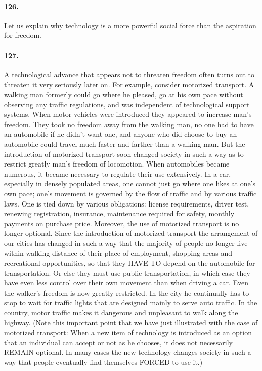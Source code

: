 \documentclass[12pt]{book}
\begin{document}
\paragraph{126.} Let us explain why technology is a more powerful social force than the aspiration for freedom.


\paragraph{127.} A technological advance that appears not to threaten freedom often turns out to threaten it very seriously later on. For example, consider motorized transport. A walking man formerly could go where he pleased, go at his own pace without observing any traffic regulations, and was independent of technological support systems. When motor vehicles were introduced they appeared to increase man's freedom. They took no freedom away from the walking man, no one had to have an automobile if he didn't want one, and anyone who did choose to buy an automobile could travel much faster and farther than a walking man. But the introduction of motorized transport soon changed society in such a way as to restrict greatly man's freedom of locomotion. When automobiles became numerous, it became necessary to regulate their use extensively. In a car, especially in densely populated areas, one cannot just go where one likes at one's own pace; one's movement is governed by the flow of traffic and by various traffic laws. One is tied down by various obligations: license requirements, driver test, renewing registration, insurance, maintenance required for safety, monthly payments on purchase price. Moreover, the use of motorized transport is no longer optional. Since the introduction of motorized transport the arrangement of our cities has changed in such a way that the majority of people no longer live within walking distance of their place of employment, shopping areas and recreational opportunities, so that they HAVE TO depend on the automobile for transportation. Or else they must use public transportation, in which case they have even less control over their own movement than when driving a car. Even the walker's freedom is now greatly restricted. In the city he continually has to stop to wait for traffic lights that are designed mainly to serve auto traffic. In the country, motor traffic makes it dangerous and unpleasant to walk along the highway. (Note this important point that we have just illustrated with the case of motorized transport: When a new item of technology is introduced as an option that an individual can accept or not as he chooses, it does not necessarily REMAIN optional. In many cases the new technology changes society in such a way that people eventually find themselves FORCED to use it.)
\end{document}
